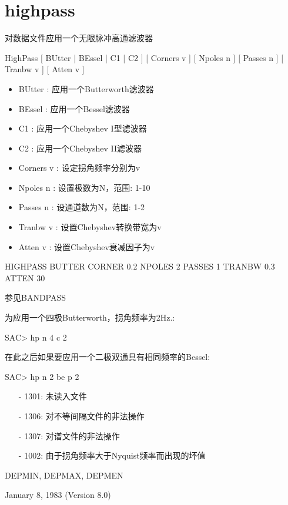 \section{highpass}
\label{cmd:highpass}

对数据文件应用一个无限脉冲高通滤波器

HighPass [ BUtter | BEssel | C1 | C2 ] [ Corners v ] [ Npoles n ] [ Passes n ] [ Tranbw v ] [ Atten v ]

\begin{itemize}
\item BUtter : 应用一个Butterworth滤波器 
\item BEssel : 应用一个Bessel滤波器  
\item C1 : 应用一个Chebyshev I型滤波器 
\item C2 : 应用一个Chebyshev II滤波器 
\item Corners v  : 设定拐角频率分别为v  
\item Npoles n : 设置极数为N，范围: 1-10
\item Passes n : 设通道数为N，范围: 1-2
\item Tranbw v : 设置Chebyshev转换带宽为v 
\item Atten v : 设置Chebyshev衰减因子为v
\end{itemize}

HIGHPASS BUTTER CORNER 0.2 NPOLES 2 PASSES 1 TRANBW 0.3 ATTEN 30

参见BANDPASS

为应用一个四极Butterworth，拐角频率为2Hz.:
\begin{SACCode}
SAC> hp n 4 c 2
\end{SACCode}
在此之后如果要应用一个二极双通具有相同频率的Bessel:
\begin{SACCode}
SAC> hp n 2 be p 2
\end{SACCode}

\begin{itemize}
\item[-]1301: 未读入文件
\item[-]1306: 对不等间隔文件的非法操作
\item[-]1307: 对谱文件的非法操作
\item[-]1002: 由于拐角频率大于Nyquist频率而出现的坏值
\end{itemize}

DEPMIN, DEPMAX, DEPMEN

January 8, 1983 (Version 8.0)
